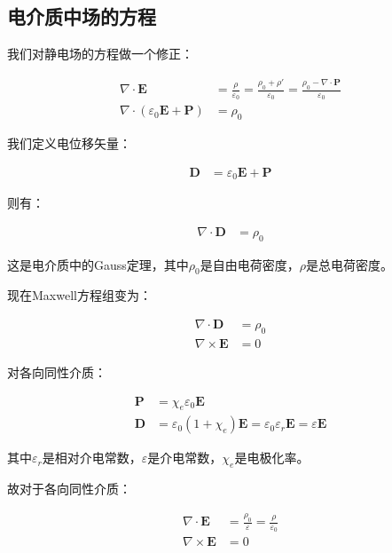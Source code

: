 \documentclass[12pt,onecolumn,a4paper]{book}
\numberwithin{table}{subsection}
\numberwithin{equation}{subsection}
\begin{document}
\subsection{电介质中场的方程}

我们对静电场的方程做一个修正：

\begin{align}
    \nabla \cdot \mathbf{E}                              & = \frac{\rho}{\varepsilon_0} = \frac{\rho_0+\rho'}{\varepsilon_0} = \frac{\rho_0-\nabla \cdot \mathbf{P}}{\varepsilon_0} \\
    \nabla \cdot (\varepsilon_0 \mathbf{E} + \mathbf{P}) & = \rho_0
\end{align}

我们定义电位移矢量：

\begin{align}
    \mathbf{D} & = \varepsilon_0 \mathbf{E} + \mathbf{P}
\end{align}

则有：

\begin{align}
    \nabla \cdot \mathbf{D} & = \rho_0
\end{align}

这是电介质中的Gauss定理，其中$\rho_0$是自由电荷密度，$\rho$是总电荷密度。

现在Maxwell方程组变为：

\begin{align}
    \nabla \cdot \mathbf{D}  & = \rho_0 \\
    \nabla \times \mathbf{E} & = 0
\end{align}

对各向同性介质：

\begin{align}
    \mathbf{P} & = \chi_e \varepsilon_0 \mathbf{E}                                                                       \\
    \mathbf{D} & = \varepsilon_0 (1+\chi_e) \mathbf{E} = \varepsilon_0 \varepsilon_r \mathbf{E} = \varepsilon \mathbf{E}
\end{align}

其中$\varepsilon_r$是相对介电常数，$\varepsilon$是介电常数，$\chi_e$是电极化率。

故对于各向同性介质：

\begin{align}
    \nabla \cdot \mathbf{E}  & = \frac{\rho_0}{\varepsilon} = \frac{\rho}{\varepsilon_0} \\
    \nabla \times \mathbf{E} & = 0
\end{align}
\end{document}
